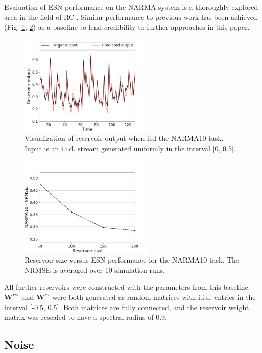 Evaluation of ESN performance on the NARMA system is a thoroughly explored area
in the field of RC \cite{verstraeten_experimental_2007, rodan_minimum_2011,
jaeger_adaptive_nodate}. Similar performance to previous work has been achieved
(Fig. \ref{visualization}, \ref{performance}) as a baseline to lend credibility
to further approaches in this paper.

\begin{figure}[htbp]
  \centering
  \includegraphics[width=2.5in]{img/narma_visualization.png}
  \caption{
    Visualization of reservoir output when fed the NARMA10 task. Input is an
i.i.d. stream generated uniformly in the interval [0, 0.5].
  }
  \label{visualization}
\end{figure}

\begin{figure}[htbp]
  \centering
  \includegraphics[width=2.5in]{img/general_performance.png}
  \caption{
    Reservoir size versus ESN performance for the NARMA10 task. The NRMSE is
averaged over 10 simulation runs.
  }
  \label{performance}
\end{figure}

All further reservoirs were constructed with the parameters from this baseline:
$\mathbf{W}^{res}$ and $\mathbf{W}^{in}$ were both generated as random matrices
with i.i.d. entries in the interval [-0.5, 0.5]. Both matrices are fully
connected, and the reservoir weight matrix was rescaled to have a spectral
radius of 0.9.

\subsection{Noise}

